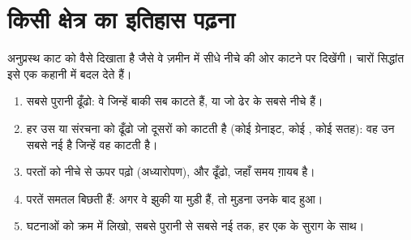 \section{किसी क्षेत्र का इतिहास पढ़ना}

अनुप्रस्थ काट  को वैसे दिखाता है जैसे वे ज़मीन में सीधे नीचे की ओर काटने पर
दिखेंगी। चारों सिद्धांत इसे एक कहानी में बदल देते हैं।

\begin{method}\label{met:g7:geological-time:ordering}
\begin{enumerate}
  \item सबसे पुरानी  ढूँढो: वे जिन्हें बाकी सब काटते हैं, या जो ढेर के
        सबसे नीचे हैं।
  \item हर उस  या संरचना को ढूँढो जो दूसरों को काटती है (कोई ग्रेनाइट, कोई
        , कोई  सतह): वह उन सबसे नई है जिन्हें वह
        काटती है।
  \item परतों को नीचे से ऊपर पढ़ो (अध्यारोपण), और  ढूँढो, जहाँ समय
        ग़ायब है।
  \item परतें समतल बिछती हैं: अगर वे झुकी या मुड़ी हैं, तो मुड़ना उनके बाद
        हुआ।
  \item घटनाओं को क्रम में लिखो, सबसे पुरानी से सबसे नई तक, हर एक के सुराग के
        साथ।
\end{enumerate}
\end{method}

